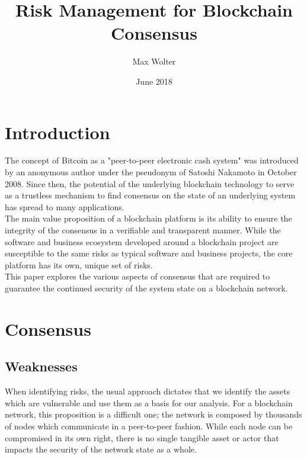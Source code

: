 \documentclass[11pt,a4paper,draft]{article}
\title{Risk Management for Blockchain Consensus}
\author{Max Wolter}
\date{June 2018}
\begin{document}
\maketitle

\begin{abstract}

\end{abstract}

\section{Introduction}

The concept of Bitcoin as a "peer-to-peer electronic cash system" was introduced by an anonymous author under the pseudonym of Satoshi Nakamoto in October 2008. Since then, the potential of the underlying blockchain technology to serve as a trustless mechanism to find consensus on the state of an underlying system has spread to many applications.\\

The main value proposition of a blockchain platform is its ability to ensure the integrity of the consensus in a verifiable and transparent manner. While the software and business ecosystem developed around a blockchain project are susceptible to the same risks as typical software and business projects, the core platform has its own, unique set of risks.\\

This paper explores the various aspects of consensus that are required to guarantee the continued security of the system state on a blockchain network.\\

\section{Consensus}

\subsection{Weaknesses}

When identifying risks, the usual approach dictates that we identify the assets which are vulnerable and use them as a basis for our analysis. For a blockchain network, this proposition is a difficult one; the network is composed by thousands of nodes which communicate in a peer-to-peer fashion. While each node can be compromised in its own right, there is no single tangible asset or actor that impacts the security of the network state as a whole.\\
\end{document}
